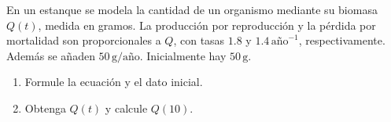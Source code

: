 En un estanque se modela la cantidad de un organismo mediante su biomasa $Q(t)$, medida en gramos. La producción por reproducción y la pérdida por mortalidad son proporcionales a $Q$, con tasas $1.8$ y $1.4\,\mathrm{año}^{-1}$, respectivamente. Además se añaden $50\,\mathrm{g/año}$. Inicialmente hay $50\,\mathrm g$.

\begin{enumerate}[label=(\alph*),ref=\alph*,leftmargin=*]
\item Formule la ecuación y el dato inicial.
\item Obtenga $Q(t)$ y calcule $Q(10)$.
\end{enumerate}
